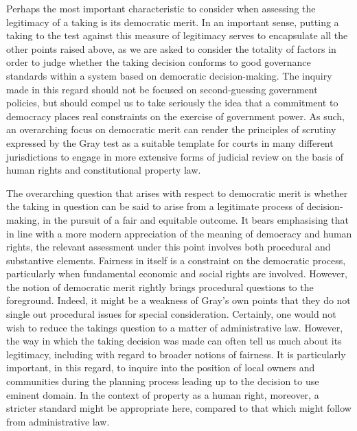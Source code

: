 Perhaps the most important characteristic to consider when assessing the legitimacy of a taking is its democratic merit. In an important sense, putting a taking to the test against this measure of legitimacy serves to encapsulate all the other points raised above, as we are asked to consider the totality of factors in order to judge whether the taking decision conforms to good governance standards within a system based on democratic decision-making. The inquiry made in this regard should not be focused on second-guessing government policies, but should compel us to take seriously the idea that a commitment to democracy places real constraints on the exercise of government power. As such, an overarching focus on democratic merit can render the principles of scrutiny expressed by the Gray test as a suitable template for courts in many different jurisdictions to engage in more extensive forms of judicial review on the basis of human rights and constitutional property law.

The overarching question that arises with respect to democratic merit is whether the taking in question 
can be said to arise from a legitimate process of decision-making, in the pursuit of a fair and equitable outcome. It bears emphasising that in line with a more modern appreciation of the meaning of democracy and human rights, the relevant assessment under this point involves both procedural and substantive elements. Fairness in itself is a constraint on the democratic process, particularly when fundamental economic and social rights are involved. However, the notion of democratic merit rightly brings procedural questions to the foreground. Indeed, it might be a weakness of Gray's own points that they do not single out procedural issues for special consideration. Certainly, one would not wish to reduce the takings question to a matter of administrative law. However, the way in which the taking decision was made can often tell us much about its legitimacy, including with regard to broader notions of fairness. It is particularly important, in this regard, to inquire into the position of local owners and communities during the planning process leading up to the decision to use eminent domain. In the context of property as a human right, moreover, a stricter standard might be appropriate here, compared to that which might follow from administrative law.

